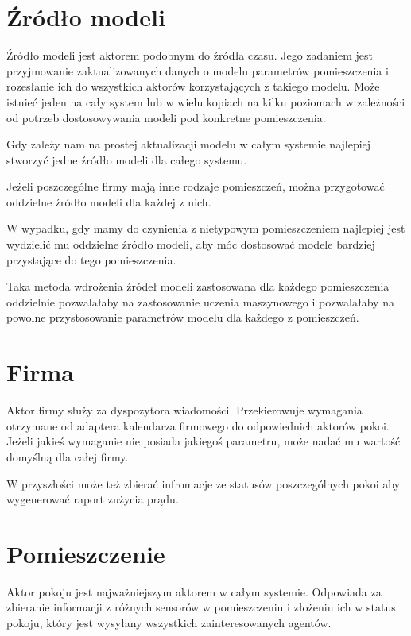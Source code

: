 \section{Źródło modeli}
Źródło modeli jest aktorem podobnym do źródła czasu. 
Jego zadaniem jest przyjmowanie zaktualizowanych danych o modelu parametrów pomieszczenia i rozesłanie ich do wszystkich aktorów korzystających z takiego modelu.
Może istnieć jeden na cały system lub w wielu kopiach na kilku poziomach w zależności od potrzeb dostosowywania modeli pod konkretne pomieszczenia.



Gdy zależy nam na prostej aktualizacji modelu w całym systemie najlepiej stworzyć jedne źródło modeli dla całego systemu. 



Jeżeli poszczególne firmy mają inne rodzaje pomieszczeń, można przygotować oddzielne źródło modeli dla każdej z nich. 



W wypadku, gdy mamy do czynienia z nietypowym pomieszczeniem najlepiej jest wydzielić mu oddzielne źródło modeli, aby móc dostosować modele bardziej przystające do tego pomieszczenia. 



Taka metoda wdrożenia źródeł modeli zastosowana dla każdego pomieszczenia oddzielnie pozwalałaby na zastosowanie uczenia maszynowego i pozwalałaby na powolne przystosowanie parametrów modelu dla każdego z pomieszczeń. 



\section{Firma}
Aktor firmy służy za dyspozytora wiadomości. Przekierowuje wymagania otrzymane od adaptera kalendarza firmowego do odpowiednich aktorów pokoi.
Jeżeli jakieś wymaganie nie posiada jakiegoś parametru, może nadać mu wartość domyślną dla całej firmy.

W przyszłości może też zbierać infromacje ze statusów poszczególnych pokoi aby wygenerować raport zużycia prądu.

\section{Pomieszczenie}
Aktor pokoju jest najważniejszym aktorem w całym systemie. 
Odpowiada za zbieranie informacji z różnych sensorów w pomieszczeniu i złożeniu ich w status pokoju, który jest wysyłany wszystkich zainteresowanych agentów.

